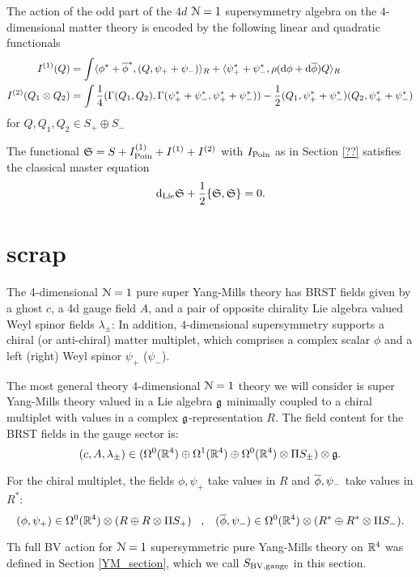 \documentclass[10pt, oneside]{article}
\begin{document}
The action of the odd part of the $4d$ $\cN=1$ supersymmetry algebra on the $4$-dimensional matter theory is encoded by the following linear and quadratic functionals 
\begin{align*}
I^{(1)}(Q) & = \int \<\phi^* + \Bar{\phi}^*, (Q, \psi_+ + \psi_-)\>_R + \<\psi_+^* + \psi_-^*, \rho(\d \phi + \d \Bar{\phi})Q \>_R \\
I^{(2)}  (Q_1 \otimes Q_2) & = \int \frac{1}{4}(\Gamma(Q_1, Q_2), \Gamma(\psi_+^* + \psi_-^*, \psi_+^*+\psi_-^*)) - \frac{1}{2}(Q_1, \psi_+^* + \psi_-^*)(Q_2, \psi_+^*+\psi_-^*)
\end{align*}
for $Q, Q_1, Q_2 \in S_+ \oplus S_-$

\begin{thm}
The functional $\fS = S + I_{\rm Poin}^{(1)} + I^{(1)} + I^{(2)}$ with $I_{\rm Poin}$ as in Section \ref{??} satisfies the classical master equation
\[
\d_{\rm Lie} \fS + \frac{1}{2} \{\fS, \fS\} = 0 .
\]
\end{thm}

\section{scrap}

The 4-dimensional $\mc N=1$ pure super Yang-Mills theory has BRST fields given by a ghost $c$, a 4d gauge field $A$, and a pair of opposite chirality Lie algebra valued Weyl spinor fields $\lambda_\pm$:
In addition, $4$-dimensional supersymmetry supports a chiral (or anti-chiral) matter multiplet, which comprises a complex scalar $\phi$ and a left (right) Weyl spinor $\psi_+$ ($\psi_-$).

The most general theory $4$-dimensional $\mc N = 1$ theory we will consider is super Yang-Mills theory valued in a Lie algebra $\fg$ minimally coupled to a chiral multiplet with values in a complex $\fg$-representation $R$. 
The field content for the BRST fields in the gauge sector is:
\[
(c, A, \lambda_\pm) \in (\Omega^0(\RR^4) \oplus \Omega^1(\RR^4) \oplus \Omega^0(\RR^4) \otimes \Pi S_\pm) \otimes \fg .
\]

For the chiral multiplet, the fields $\phi, \psi_+$ take values in $R$ and $\Bar{\phi}, \psi_-$ take values in $R^*$:
\[
(\phi, \psi_+) \in \Omega^0(\RR^4) \otimes (R \oplus R \otimes \Pi S_+) \;\;\; , \;\;\; (\Bar{\phi}, \psi_-) \in \Omega^0(\RR^4) \otimes (R^* \oplus R^* \otimes \Pi S_-) .
\]

Th full BV action for $\cN=1$ supersymmetric pure Yang-Mills theory on $\RR^4$ was defined in Section \ref{YM_section}, which we call $S_{\rm BV, gauge}$ in this section.
\end{document}
